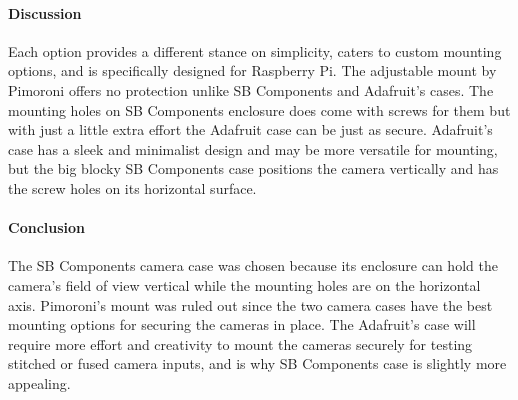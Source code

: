 \paragraph{Discussion}

Each option provides a different stance on simplicity, caters to custom mounting 
options, and is specifically designed for Raspberry Pi. The adjustable mount 
by Pimoroni offers no protection unlike SB Components and Adafruit's cases. The 
mounting holes on SB Components enclosure does come with screws for them but with 
just a little extra effort the Adafruit case can be just as secure. Adafruit's 
case has a sleek and minimalist design and may be more versatile for mounting, but 
the big blocky SB Components case positions the camera vertically and has the 
screw holes on its horizontal surface. \\

\paragraph{Conclusion}

The SB Components camera case was chosen because its enclosure can hold the camera's 
field of view vertical while the mounting holes are on the horizontal axis. Pimoroni's
mount was ruled out since the two camera cases have the best mounting options for 
securing the cameras in place. The Adafruit's case will require 
more effort and creativity to mount the cameras securely for testing stitched or 
fused camera inputs, and is why SB Components case is slightly more appealing.\\